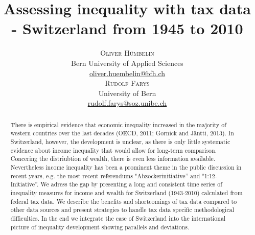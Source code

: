 \documentclass[twoside]{article}\usepackage[]{graphicx}\usepackage[]{color}
\title{\vspace{-15mm}\fontsize{24pt}{10pt}\selectfont\textbf{Assessing inequality with tax data - Switzerland from 1945 to 2010}} %
\author{
\large
\textsc{Oliver Hümbelin}\\[2mm] %
\normalsize Bern University of Applied Sciences \\ %
\normalsize \href{mailto:oliver.huembelin@bfh.ch}{oliver.huembelin@bfh.ch} %
\vspace{5mm}\\
\large
\textsc{Rudolf Farys}\\[2mm] %
\normalsize University of Bern \\ %
\normalsize \href{mailto:rudolf.farys@soz.unibe.ch}{rudolf.farys@soz.unibe.ch} %
\vspace{-5mm}
}
\date{}
\begin{document}
\maketitle 

\thispagestyle{fancy} %





\begin{abstract}

There is empirical evidence that economic inequality increased in the majority of western countries over the last decades (OECD, 2011; Gornick and Jäntti, 2013). In Switzerland, however, the development is unclear, as there is only little systematic evidence about income inequality that would allow for long-term comparison. Concering the distriubtion of wealth, there is even less information available. Nevertheless income inequality has been a prominent theme in the public discussion in recent years, e.g. the most recent referendums "Abzockerinitiative'' and "1:12-Initiative''. We adress the gap by presenting a long and consistent time series of inequality measures for income and wealth for Switzerland (1943-2010) calculated from federal tax data. We describe the benefits and shortcomings of tax data compared to other data sources and present strategies to handle tax data specific methodological difficulties. In the end we integrate the case of Switzerland into the international picture of inequality development showing parallels and deviations.


\end{abstract}




\end{document}
